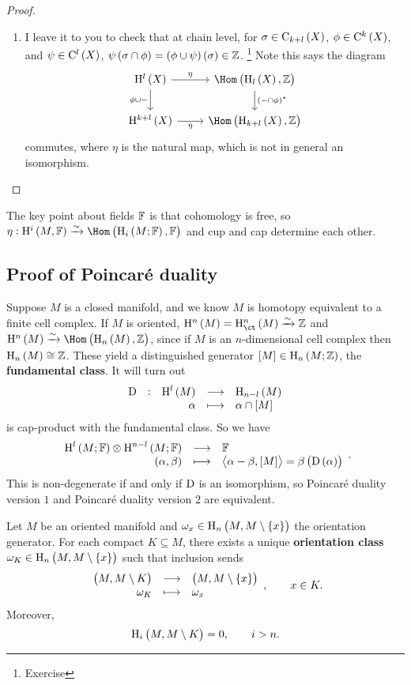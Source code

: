 \begin{proof}
\begin{enumerate}
\pagebreak

\item I leave it to you to check that at chain level, for $ \sigma \in \C_{k + l}\br{X} $, $ \phi \in \C^k\br{X} $, and $ \psi \in \C^l\br{X} $, $ \psi\br{\sigma \cap \phi} = \br{\phi \cup \psi}\br{\sigma} \in \ZZ $. \footnote{Exercise} Note this says the diagram
$$
\begin{tikzcd}
\H^l\br{X} \arrow{r}{\eta} \arrow{d}[swap]{\phi \cup -} & \Hom\br{\H_l\br{X}, \ZZ} \arrow{d}{\br{- \cap \phi}^*} \\
\H^{k + l}\br{X} \arrow{r}[swap]{\eta} & \Hom\br{\H_{k + l}\br{X}, \ZZ}
\end{tikzcd}
$$
commutes, where $ \eta $ is the natural map, which is not in general an isomorphism.
\end{enumerate}
\end{proof}

\begin{remark*}
The key point about fields $ \mathbb{F} $ is that cohomology is free, so $ \eta : \H^i\br{M, \FF} \xrightarrow{\sim} \Hom\br{\H_i\br{M; \FF}, \FF} $ and cup and cap determine each other.
\end{remark*}

\subsection{Proof of Poincar\'e duality}

Suppose $ M $ is a closed manifold, and we know $ M $ is homotopy equivalent to a finite cell complex. If $ M $ is oriented, $ \H^n\br{M} = \Hc^n\br{M} \xrightarrow{\sim} \ZZ $ and $ \H^n\br{M} \xrightarrow{\sim} \Hom\br{\H_n\br{M}, \ZZ} $, since if $ M $ is an $ n $-dimensional cell complex then $ \H_n\br{M} \cong \ZZ $. These yield a distinguished generator $ \sbr{M} \in \H_n\br{M; \ZZ} $, the \textbf{fundamental class}. It will turn out
$$ \function[\D]{\H^l\br{M}}{\H_{n - l}\br{M}}{\alpha}{\alpha \cap \sbr{M}} $$
is cap-product with the fundamental class. So we have
$$ \function{\H^l\br{M; \FF} \otimes \H^{n - l}\br{M; \FF}}{\FF}{\br{\alpha, \beta}}{\abr{\alpha - \beta, \sbr{M}} = \beta\br{\D\br{\alpha}}}. $$
This is non-degenerate if and only if $ \mathrm{D} $ is an isomorphism, so Poincar\'e duality version $ 1 $ and Poincar\'e duality version $ 2 $ are equivalent.

\begin{proposition}
\label{prop:orientationclass}
Let $ M $ be an oriented manifold and $ \omega_x \in \H_n\br{M, M \setminus \cbr{x}} $ the orientation generator. For each compact $ K \subseteq M $, there exists a unique \textbf{orientation class} $ \omega_K \in \H_n\br{M, M \setminus \cbr{x}} $ such that inclusion sends
$$ \function{\br{M, M \setminus K}}{\br{M, M \setminus \cbr{x}}}{\omega_K}{\omega_x}, \qquad x \in K. $$
Moreover,
$$ \H_i\br{M, M \setminus K} = 0, \qquad i > n. $$
\end{proposition}

